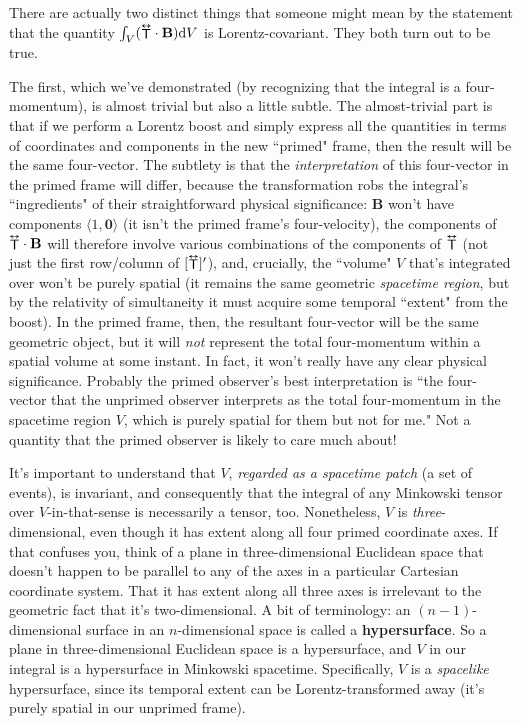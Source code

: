 \documentclass[12pt]{article}
\renewcommand{\vv}[1]{\mathbf{#1}}
\newcommand{\dd}[1]{\mathrm{d}#1}
\newcommand{\tightoverset}[2]{%
  \mathop{#2}\limits^{\vbox to -.5ex{\kern-0.75ex\hbox{$#1$}\vss}}}
\newcommand{\inlinedy}[1]{\tightoverset{\text{\tiny$\bm\leftrightarrow$}}{#1}}
\begin{document}
There are actually two distinct things that someone might mean by the statement that the quantity ${\int_V ({\inlinedy{\mathsf{T}}} \cdot \vv B) \dd V}$ is Lorentz-covariant. They both turn out to be true.

The first, which we've demonstrated (by recognizing that the integral is a four-momentum), is almost trivial but also a little subtle. The almost-trivial part is that if we perform a Lorentz boost and simply express all the quantities in terms of coordinates and components in the new ``primed" frame, then the result will be the same four-vector. The subtlety is that the \emph{interpretation} of this four-vector in the primed frame will differ, because the transformation robs the integral's ``ingredients" of their straightforward physical significance: $\vv B$ won't have components $\langle 1, \vv 0 \rangle$ (it isn't the primed frame's four-velocity), the components of ${\inlinedy{\mathsf{T}}} \cdot \vv B$ will therefore involve various combinations of the components of ${\inlinedy{\mathsf{T}}}$ (not just the first row/column of $[{\inlinedy{\mathsf{T}}}] ^\prime$), and, crucially, the ``volume" $V$ that's integrated over won't be purely spatial (it remains the same geometric \emph{spacetime region}, but by the relativity of simultaneity it must acquire some temporal ``extent" from the boost). In the primed frame, then, the resultant four-vector will be the same geometric object, but it will \emph{not} represent the total four-momentum within a spatial volume at some instant. In fact, it won't really have any clear physical significance. Probably the primed observer's best interpretation is ``the four-vector that the unprimed observer interprets as the total four-momentum in the spacetime region $V$, which is purely spatial for them but not for me." Not a quantity that the primed observer is likely to care much about!

It's important to understand that $V$, \emph{regarded as a spacetime patch} (a set of events), is invariant, and consequently that the integral of any Minkowski tensor over $V$-in-that-sense is necessarily a tensor, too. Nonetheless, $V$ is \emph{three}-dimensional, even though it has extent along all four primed coordinate axes. If that confuses you, think of a plane in three-dimensional Euclidean space that doesn't happen to be parallel to any of the axes in a particular Cartesian coordinate system. That it has extent along all three axes is irrelevant to the geometric fact that it's two-dimensional. A bit of terminology: an $(n - 1)$-dimensional surface in an $n$-dimensional space is called a \textbf{hypersurface}. So a plane in three-dimensional Euclidean space is a hypersurface, and $V$ in our integral is a hypersurface in Minkowski spacetime. Specifically, $V$ is a \emph{spacelike} hypersurface, since its temporal extent can be Lorentz-transformed away (it's purely spatial in our unprimed frame).
\end{document}
